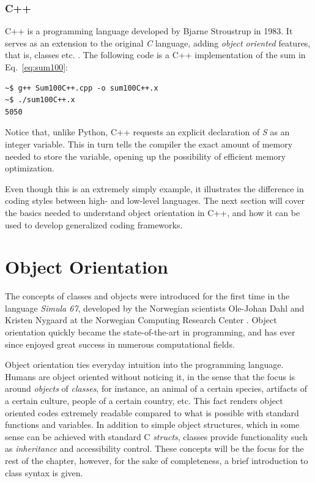 \subsubsection{C++}

C++ is a programming language developed by Bjarne Stroustrup in 1983. It serves as an extension to the original \textit{C} language, adding \textit{object oriented} features, that is, classes etc. \cite{ORegan}. The following code is a C++ implementation of the sum in Eq.~\ref{eq:sum100}:

\vspace{0.5 cm}


\begin{verbatim}
~$ g++ Sum100C++.cpp -o sum100C++.x
~$ ./sum100C++.x 
5050
\end{verbatim}


Notice that, unlike Python, C++ requests an explicit declaration of \textit{S} as an integer variable. This in turn tells the compiler the exact amount of memory needed to store the variable, opening up the possibility of efficient memory optimization. 

Even though this is an extremely simply example, it illustrates the difference in coding styles between high- and low-level languages. The next section will cover the basics needed to understand object orientation in C++, and how it can be used to develop generalized coding frameworks.

\section{Object Orientation}
\label{sec:OO}

The concepts of classes and objects were introduced for the first time in the language \textit{Simula 67}, developed by the Norwegian scientists Ole-Johan Dahl and Kristen Nygaard at the Norwegian Computing Research Center \cite{ORegan}. Object orientation quickly became the state-of-the-art in programming, and has ever since enjoyed great success in numerous computational fields. 

Object orientation ties everyday intuition into the programming language. Humans are object oriented without noticing it, in the sense that the focus is around \textit{objects} of \textit{classes}, for instance, an animal of a certain species, artifacts of a certain culture, people of a certain country, etc. This fact renders object oriented codes extremely readable compared to what is possible with standard functions and variables. In addition to simple object structures, which in some sense can be achieved with standard C \textit{structs}, classes provide functionality such as \textit{inheritance} and accessibility control. These concepts will be the focus for the rest of the chapter, however, for the sake of completeness, a brief introduction to class syntax is given.

